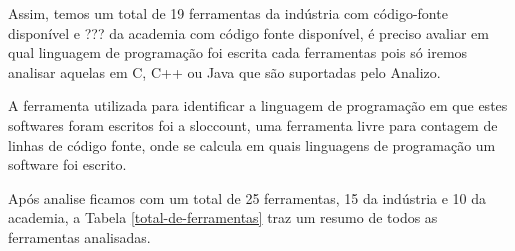 \documentclass[qual, classic, a4paper]{ufbathesis}
\begin{document}
Assim, temos um total de 19 ferramentas da indústria com código-fonte
disponível e ??? da academia com código fonte disponível, é preciso avaliar em
qual linguagem de programação foi escrita cada ferramentas pois só iremos
analisar aquelas em C, C++ ou Java que são suportadas pelo Analizo.

A ferramenta utilizada para identificar a linguagem de programação em que
estes softwares foram escritos foi a sloccount, uma ferramenta livre para
contagem de linhas de código fonte, onde se calcula em quais linguagens de
programação um software foi escrito.


Após analise ficamos com um total de 25 ferramentas, 15 da indústria e 10 da
academia, a Tabela \ref{total-de-ferramentas} traz um resumo de todos as
ferramentas analisadas.
\end{document}
